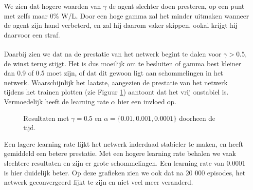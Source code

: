 \documentclass[11pt]{article}
\begin{document}
\noindent We zien dat hogere waarden van $\gamma$ de agent slechter doen presteren, op een punt met zelfs maar 0\% W/L. Door een hoge gamma zal het minder uitmaken wanneer de agent zijn hand verbeterd, en zal hij daarom vaker skippen, ookal krijgt hij daarvoor een straf.\\\\
\noindent Daarbij zien we dat na de prestatie van het netwerk begint te dalen voor $\gamma > 0.5$, de winst terug stijgt. Het is dus moeilijk om te besluiten of gamma best kleiner dan 0.9 of 0.5 moet zijn, of dat dit gewoon ligt aan schommelingen in het netwerk. Waarschijnlijk het laatste, aangezien de prestatie van het netwerk tijdens het trainen plotten (zie Figuur \ref{fig:kleine-dqn}) aantoont dat het vrij onstabiel is. Vermoedelijk heeft de learning rate $\alpha$ hier een invloed op.
\begin{figure}[H]
    \centering
    \qquad
    \caption{Resultaten met $\gamma = 0.5$ en $\alpha = \{0.01, 0.001, 0.0001\}$ doorheen de tijd.}
    \label{fig:kleine-dqn}
\end{figure}
\noindent Een lagere learning rate lijkt het netwerk inderdaad stabieler te maken, en heeft gemiddeld een betere prestatie. Met een hogere learning rate behalen we vaak slechtere resultaten en zijn er grote schommelingen. Een learning rate van 0.0001 is hier duidelijk beter. Op deze grafieken zien we ook dat na 20 000 episodes, het netwerk geconvergeerd lijkt te zijn en niet veel meer veranderd. \\\\
\end{document}
